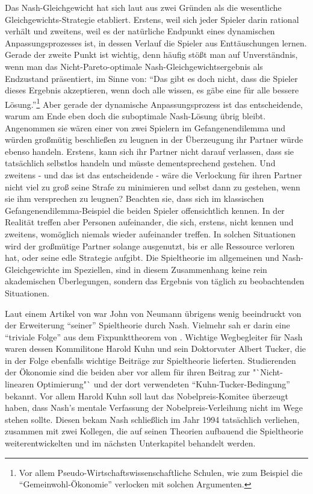 Das Nash-Gleichgewicht hat sich laut \textcite[S. 61]{Holler2005} aus zwei Gründen als die wesentliche Gleichgewichts-Strategie etabliert. Erstens, weil sich jeder Spieler darin rational verhält und zweitens, weil es der natürliche Endpunkt eines dynamischen Anpassungsprozesses ist, in dessen Verlauf die Spieler aus Enttäuschungen lernen. Gerade der zweite Punkt ist wichtig, denn häufig stößt man auf Unverständnis, wenn man das Nicht-Pareto-optimale Nash-Gleichgewichtsergebnis als Endzustand präsentiert, im Sinne von: "`Das gibt es doch nicht, dass die Spieler dieses Ergebnis akzeptieren, wenn doch alle wissen, es gäbe eine für alle bessere Lösung."'\footnote{Vor allem Pseudo-Wirtschaftswissenschaftliche Schulen, wie zum Beispiel die "`Gemeinwohl-Ökonomie"' verlocken mit solchen Argumenten.} Aber gerade der dynamische Anpassungsprozess ist das entscheidende, warum am Ende eben doch die suboptimale Nash-Lösung übrig bleibt. Angenommen sie wären einer von zwei Spielern im Gefangenendilemma und würden großmütig beschließen zu leugnen in der Überzeugung ihr Partner würde ebenso handeln. Erstens, kann sich ihr Partner nicht darauf verlassen, dass sie tatsächlich selbstlos handeln und müsste dementsprechend gestehen. Und zweitens - und das ist das entscheidende - wäre die Verlockung für ihren Partner nicht viel zu groß seine Strafe zu minimieren und selbst dann zu gestehen, wenn sie ihm versprechen zu leugnen? Beachten sie, dass sich im klassischen Gefangenendilemma-Beispiel die beiden Spieler offensichtlich kennen. In der Realität treffen aber Personen aufeinander, die sich, erstens, nicht kennen und zweitens, womöglich niemals wieder aufeinander treffen. In solchen Situationen wird der großmütige Partner solange ausgenutzt, bis er alle Ressource verloren hat, oder seine edle Strategie aufgibt. Die Spieltheorie im allgemeinen und Nash-Gleichgewichte im Speziellen, sind in diesem Zusammenhang keine rein akademischen Überlegungen, sondern das Ergebnis von täglich zu beobachtenden Situationen.

Laut einem Artikel von \textcite{Cassidy2015} war John von Neumann übrigens wenig beeindruckt von der Erweiterung "`seiner"' Spieltheorie durch Nash. Vielmehr sah er darin eine "`triviale Folge"' aus dem Fixpunkttheorem von \textcite{Brouwer1912}. Wichtige Wegbegleiter für Nash waren dessen Kommilitone Harold Kuhn und sein Doktorvater Albert Tucker, die in der Folge ebenfalls wichtige Beiträge zur Spieltheorie lieferten. Studierenden der Ökonomie sind die beiden aber vor allem für ihren Beitrag zur "`Nicht-linearen Optimierung"` und der dort verwendeten "`Kuhn-Tucker-Bedingung"' \parencite{Kuhn1951} bekannt. Vor allem Harold Kuhn soll laut \textcite{Rubinstein2003} das Nobelpreis-Komitee überzeugt haben, dass Nash's mentale Verfassung der Nobelpreis-Verleihung nicht im Wege stehen sollte. Diesen bekam Nash schließlich im Jahr 1994 tatsächlich verliehen, zusammen mit zwei Kollegen, die auf seinen Theorien aufbauend die Spieltheorie weiterentwickelten und im nächsten Unterkapitel behandelt werden.


